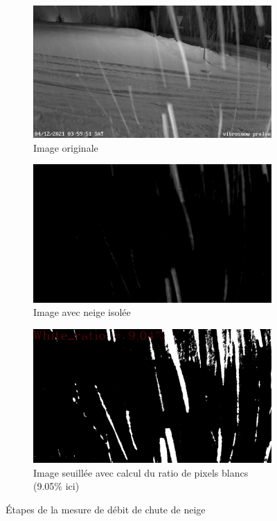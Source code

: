 \begin{figure}[H]
    \begin{subfigure}{.45\textwidth}
        \includegraphics[width=\linewidth]{Images/computer_vision/snowfall/original.png}
        \caption{Image originale}
        \label{fig:Snowfall_original}
    \end{subfigure}
    \hfill
    \begin{subfigure}{.45\textwidth}
        \includegraphics[width=\linewidth]{Images/computer_vision/snowfall/noise.png}
        \caption{Image avec neige isolée}
        \label{fig:Snowfall_noise}
    \end{subfigure}
    \hfill
    \centering
    \begin{subfigure}{.45\textwidth}
        \includegraphics[width=\linewidth]{Images/computer_vision/snowfall/snowfall.png}
        \caption{Image seuillée avec calcul du ratio de pixels blancs (9.05\% ici)}
        \label{fig:Snowfall_thres}
    \end{subfigure}
    \caption{Étapes de la mesure de débit de chute de neige}
    \label{fig:Snowfall_algorithm}
\end{figure}
